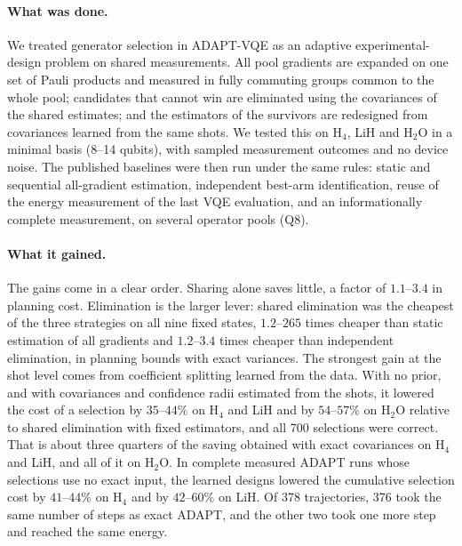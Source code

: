 \documentclass[aps,pra,reprint,superscriptaddress,nofootinbib]{revtex4-2}
\begin{document}
\paragraph{What was done.} We treated generator selection in ADAPT-VQE as an adaptive experimental-design problem on shared measurements. All pool gradients are expanded on one set of Pauli products and measured in fully commuting groups common to the whole pool; candidates that cannot win are eliminated using the covariances of the shared estimates; and the estimators of the survivors are redesigned from covariances learned from the same shots. We tested this on H$_4$, LiH and H$_2$O in a minimal basis (8--14 qubits), with sampled measurement outcomes and no device noise. The published baselines were then run under the same rules: static and sequential all-gradient estimation, independent best-arm identification, reuse of the energy measurement of the last VQE evaluation, and an informationally complete measurement, on several operator pools (Q8).

\paragraph{What it gained.} The gains come in a clear order. Sharing alone saves little, a factor of $1.1$--$3.4$ in planning cost. Elimination is the larger lever: shared elimination was the cheapest of the three strategies on all nine fixed states, $1.2$--$265$ times cheaper than static estimation of all gradients and $1.2$--$3.4$ times cheaper than independent elimination, in planning bounds with exact variances. The strongest gain at the shot level comes from coefficient splitting learned from the data. With no prior, and with covariances and confidence radii estimated from the shots, it lowered the cost of a selection by $35$--$44\%$ on H$_4$ and LiH and by $54$--$57\%$ on H$_2$O relative to shared elimination with fixed estimators, and all 700 selections were correct. That is about three quarters of the saving obtained with exact covariances on H$_4$ and LiH, and all of it on H$_2$O. In complete measured ADAPT runs whose selections use no exact input, the learned designs lowered the cumulative selection cost by $41$--$44\%$ on H$_4$ and by $42$--$60\%$ on LiH. Of 378 trajectories, 376 took the same number of steps as exact ADAPT, and the other two took one more step and reached the same energy.
\end{document}
